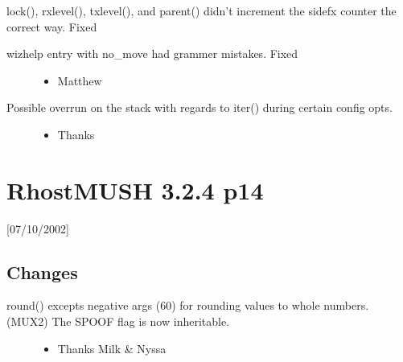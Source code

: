 \documentclass[letterpaper,10pt,english]{sphinxmanual}
\begin{document}
\sphinxAtStartPar
lock(), rxlevel(), txlevel(), and parent() didn’t increment the sidefx counter the correct way.  \sphinxhyphen{} Fixed
\begin{description}
\item[{wizhelp entry with no\_move had grammer mistakes. \sphinxhyphen{} Fixed}] \leavevmode\begin{itemize}
\item {} 
\sphinxAtStartPar
Matthew

\end{itemize}

\item[{Possible overrun on the stack with regards to iter() during certain config opts.}] \leavevmode\begin{itemize}
\item {} 
\sphinxAtStartPar
Thanks 

\end{itemize}

\end{description}


\section{RhostMUSH 3.2.4 p14}
\label{\detokenize{changelog:rhostmush-3-2-4-p14}}\label{\detokenize{changelog:changelog-3-2-4p14}}
\sphinxAtStartPar
{[}07/10/2002{]}


\subsection{Changes}
\label{\detokenize{changelog:id18}}\begin{description}
\item[{round() excepts negative args (60) for rounding values to whole numbers. (MUX2) The SPOOF flag is now inheritable.}] \leavevmode\begin{itemize}
\item {} 
\sphinxAtStartPar
Thanks Milk \& Nyssa

\end{itemize}

\end{description}
\end{document}
